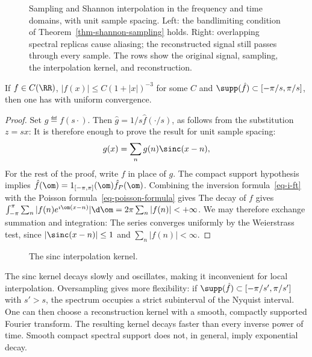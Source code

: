 \begin{figure}[tbp]
\centering
{}
\caption{Sampling and Shannon interpolation in the frequency and time domains, with unit sample spacing. Left: the bandlimiting condition of Theorem~\ref{thm-shannon-sampling} holds. Right: overlapping spectral replicas cause aliasing; the reconstructed signal still passes through every sample. The rows show the original signal, sampling, the interpolation kernel, and reconstruction.}
\label{fig-sampling-aliasing}
\end{figure}





\begin{thm} \label{thm-shannon-sampling}
	If $f\in C(\RR)$, $|f(x)| \leq C(1+|x|)^{-3}$ for some $C$ and $\supp(\hat f) \subset [-\pi/s,\pi/s]$, then one has
	with uniform convergence.
\end{thm}

\begin{proof} 
	Set $g \eqdef f(s \cdot)$. Then $\hat g=1/s \hat f(\cdot/s)$, as follows from the substitution $z=s x$:
	It is therefore enough to prove the result for unit sample spacing:
	$$
		g(x) = \sum_n g(n) \sinc(x-n), 
	$$
	For the rest of the proof, write $f$ in place of $g$.
	The compact support hypothesis implies $\hat f(\om) = 1_{[-\pi,\pi]}(\om) \hat f_P(\om)$.  
	Combining the inversion formula~\eqref{eq-i-ft} with the Poisson formula~\eqref{eq-poisson-formula} gives
	The decay of $f$ gives $\int_{-\pi}^\pi \sum_n |f(n) e^{\imath \om (x-n)}| \d \om = 2\pi\sum_n |f(n)| < +\infty$. We may therefore exchange summation and integration:
The series converges uniformly by the Weierstrass test, since $|\sinc(x-n)|\leq 1$ and $\sum_n|f(n)|<\infty$.
\end{proof}

\begin{figure}[tbp]
\centering
{}
\caption{The sinc interpolation kernel.}
\label{fig-review-shannon-sinc}
\end{figure}
The sinc kernel decays slowly and oscillates, making it inconvenient for local interpolation. Oversampling gives more flexibility: if $\supp(\hat f)\subset[-\pi/s',\pi/s']$ with $s'>s$, the spectrum occupies a strict subinterval of the Nyquist interval. One can then choose a reconstruction kernel with a smooth, compactly supported Fourier transform. The resulting kernel decays faster than every inverse power of time. Smooth compact spectral support does not, in general, imply exponential decay.

